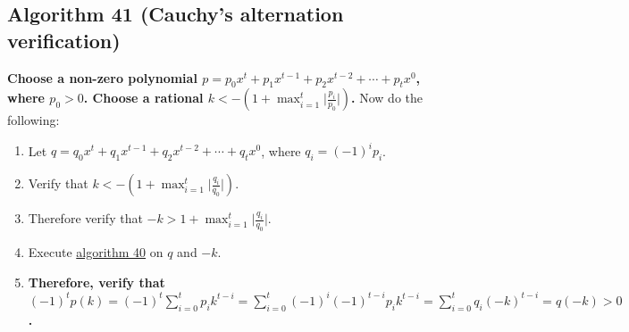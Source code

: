 \documentclass[twocolumn]{article}
\begin{document}
		\subsection{Algorithm 41 (Cauchy's alternation verification)}\label{sec:algorithm 41}
			\textbf{Choose a non-zero polynomial $p=p_0x^t+p_1x^{t-1}+p_2x^{t-2}+\cdots+p_tx^0$, where $p_0>0$. Choose a rational $k<-(1+\max_{i=1}^t\lvert\frac{p_i}{p_0}\rvert)$.} Now do the following:
			\begin{enumerate}
				\item Let $q=q_0x^t+q_1x^{t-1}+q_2x^{t-2}+\cdots+q_tx^0$, where $q_i=(-1)^ip_i$.
				\item Verify that $k<-(1+\max_{i=1}^t\lvert\frac{q_i}{q_0}\rvert)$.
				\item Therefore verify that $-k>1+\max_{i=1}^t\lvert\frac{q_i}{q_0}\rvert$.
				\item Execute \hyperref[sec:algorithm 40]{algorithm 40} on $q$ and $-k$.
				\item \textbf{Therefore, verify that $(-1)^tp(k)=(-1)^t\sum_{i=0}^t p_ik^{t-i}=\sum_{i=0}^t (-1)^i(-1)^{t-i}p_ik^{t-i}=\sum_{i=0}^t q_i(-k)^{t-i}=q(-k)>0$.}
			\end{enumerate}
\end{document}
